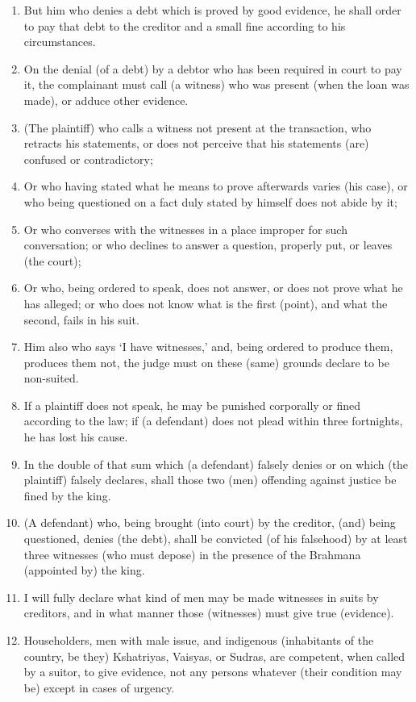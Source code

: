 \begin{enumerate}
\item But him who denies a debt which is proved by good evidence, he shall order to pay that debt to the creditor and a small fine according to his circumstances.
\item On the denial (of a debt) by a debtor who has been required in court to pay it, the complainant must call (a witness) who was present (when the loan was made), or adduce other evidence.
\item (The plaintiff) who calls a witness not present at the transaction, who retracts his statements, or does not perceive that his statements (are) confused or contradictory;
\item Or who having stated what he means to prove afterwards varies (his case), or who being questioned on a fact duly stated by himself does not abide by it;
\item Or who converses with the witnesses in a place improper for such conversation; or who declines to answer a question, properly put, or leaves (the court);
\item Or who, being ordered to speak, does not answer, or does not prove what he has alleged; or who does not know what is the first (point), and what the second, fails in his suit.
\item Him also who says `I have witnesses,' and, being ordered to produce them, produces them not, the judge must on these (same) grounds declare to be non-suited.
\item If a plaintiff does not speak, he may be punished corporally or fined according to the law; if (a defendant) does not plead within three fortnights, he has lost his cause.
\item In the double of that sum which (a defendant) falsely denies or on which (the plaintiff) falsely declares, shall those two (men) offending against justice be fined by the king.
\item (A defendant) who, being brought (into court) by the creditor, (and) being questioned, denies (the debt), shall be convicted (of his falsehood) by at least three witnesses (who must depose) in the presence of the Brahmana (appointed by) the king.
\item I will fully declare what kind of men may be made witnesses in suits by creditors, and in what manner those (witnesses) must give true (evidence).
\item Householders, men with male issue, and indigenous (inhabitants of the country, be they) Kshatriyas, Vaisyas, or Sudras, are competent, when called by a suitor, to give evidence, not any persons whatever (their condition may be) except in cases of urgency.

\end{enumerate}
